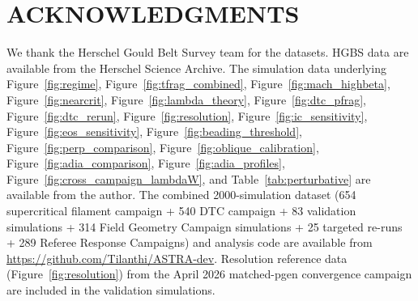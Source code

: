 \documentclass[twoside,twocolumn]{mnras}
\begin{document}
\section*{ACKNOWLEDGMENTS}

We thank the Herschel Gould Belt Survey team for the datasets. HGBS data are available from the Herschel Science Archive. The simulation data underlying Figure~\ref{fig:regime}, Figure~\ref{fig:tfrag_combined}, Figure~\ref{fig:mach_highbeta}, Figure~\ref{fig:nearcrit}, Figure~\ref{fig:lambda_theory}, Figure~\ref{fig:dtc_pfrag}, Figure~\ref{fig:dtc_rerun}, Figure~\ref{fig:resolution}, Figure~\ref{fig:ic_sensitivity}, Figure~\ref{fig:eos_sensitivity}, Figure~\ref{fig:beading_threshold}, Figure~\ref{fig:perp_comparison}, Figure~\ref{fig:oblique_calibration}, Figure~\ref{fig:adia_comparison}, Figure~\ref{fig:adia_profiles}, Figure~\ref{fig:cross_campaign_lambdaW}, and Table~\ref{tab:perturbative} are available from the author. The combined 2000-simulation dataset (654 supercritical filament campaign + 540 DTC campaign + 83 validation simulations + 314 Field Geometry Campaign simulations + 25 targeted re-runs + 289 Referee Response Campaigns) and analysis code are available from \url{https://github.com/Tilanthi/ASTRA-dev}. Resolution reference data (Figure~\ref{fig:resolution}) from the April 2026 matched-pgen convergence campaign are included in the validation simulations.



\end{document}
